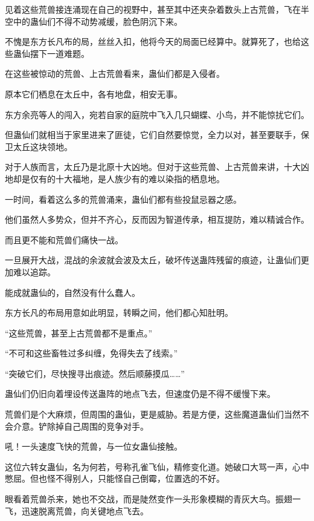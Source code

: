 
\begin{this_body}



见着这些荒兽接连涌现在自己的视野中，甚至其中还夹杂着数头上古荒兽，飞在半空中的蛊仙们不得不动势减缓，脸色阴沉下来。

不愧是东方长凡布的局，丝丝入扣，他将今天的局面已经算中。就算死了，也给这些蛊仙摆下一道难题。

在这些被惊动的荒兽、上古荒兽看来，蛊仙们都是入侵者。

原本它们栖息在太丘中，各有地盘，相安无事。

东方余亮等人的闯入，宛若自家的庭院中飞入几只蝴蝶、小鸟，并不能惊扰它们。

但蛊仙们就相当于家里进来了匪徒，它们自然要惊觉，全力以对，甚至要联手，保卫太丘这块领地。

对于人族而言，太丘乃是北原十大凶地。但对于这些荒兽、上古荒兽来讲，十大凶地却是仅有的十大福地，是人族少有的难以染指的栖息地。

一时间，看着这么多的荒兽涌来，蛊仙们都有些投鼠忌器之感。

他们虽然人多势众，但并不齐心，反而因为智道传承，相互提防，难以精诚合作。

而且更不能和荒兽们痛快一战。

一旦展开大战，混战的余波就会波及太丘，破坏传送蛊阵残留的痕迹，让蛊仙们更加难以追踪。

能成就蛊仙的，自然没有什么蠢人。

东方长凡的布局用意如此明显，转瞬之间，他们都心知肚明。

“这些荒兽，甚至上古荒兽都不是重点。”

“不可和这些畜牲过多纠缠，免得失去了线索。”

“突破它们，尽快搜寻出痕迹。然后顺藤摸瓜……”

蛊仙们仍旧向着埋设传送蛊阵的地点飞去，但速度仍是不得不缓慢下来。

荒兽们是个大麻烦，但周围的蛊仙，更是威胁。若是方便，这些魔道蛊仙们当然不会介意。铲除掉自己周围的竞争对手。

吼！一头速度飞快的荒兽，与一位女蛊仙接触。

这位六转女蛊仙，名为何若，号称孔雀飞仙，精修变化道。她破口大骂一声，心中憋屈。但也怪不得别人，只能怪自己倒霉，位置选的不好。

眼看着荒兽杀来，她也不交战，而是陡然变作一头形象模糊的青灰大鸟。振翅一飞，迅速脱离荒兽，向关键地点飞去。


\end{this_body}
